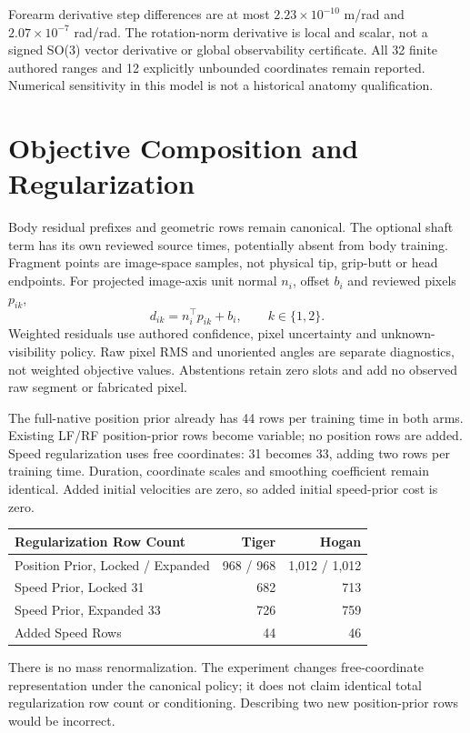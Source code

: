 \documentclass[11pt,letterpaper]{article}
\newcommand{\chapterpage}[1]{\par\clearpage\section{#1}}
\begin{document}
Forearm derivative step differences are at most $2.23\times10^{-10}$ m/rad and
$2.07\times10^{-7}$ rad/rad. The rotation-norm derivative is local and scalar,
not a signed SO(3) vector derivative or global observability certificate.
All 32 finite authored ranges and 12 explicitly unbounded coordinates remain reported.
Numerical sensitivity in this model is not a historical anatomy qualification.
\chapterpage{Objective Composition and Regularization}
Body residual prefixes and geometric rows remain canonical. The optional shaft term has
its own reviewed source times, potentially absent from body training.
Fragment points are image-space samples, not physical tip, grip-butt or head endpoints.
For projected image-axis unit normal $n_i$, offset $b_i$ and reviewed pixels $p_{ik}$,
\[
d_{ik}=n_i^\top p_{ik}+b_i,\qquad k\in\{1,2\}.
\]
Weighted residuals use authored confidence, pixel uncertainty and unknown-visibility policy.
Raw pixel RMS and unoriented angles are separate diagnostics, not weighted objective values.
Abstentions retain zero slots and add no observed raw segment or fabricated pixel.

The full-native position prior already has 44 rows per training time in both arms.
Existing LF/RF position-prior rows become variable; no position rows are added.
Speed regularization uses free coordinates: 31 becomes 33, adding two rows per training time.
Duration, coordinate scales and smoothing coefficient remain identical.
Added initial velocities are zero, so added initial speed-prior cost is zero.
\par\smallskip
\begin{tabular}{@{}lrr@{}}\toprule
Regularization Row Count & Tiger & Hogan\\\midrule
Position Prior, Locked / Expanded & 968 / 968 & 1,012 / 1,012\\
Speed Prior, Locked 31 & 682 & 713\\
Speed Prior, Expanded 33 & 726 & 759\\
Added Speed Rows & 44 & 46\\\bottomrule
\end{tabular}\par\smallskip

There is no mass renormalization. The experiment changes free-coordinate representation
under the canonical policy; it does not claim identical total regularization row count or
conditioning. Describing two new position-prior rows would be incorrect.
\end{document}
